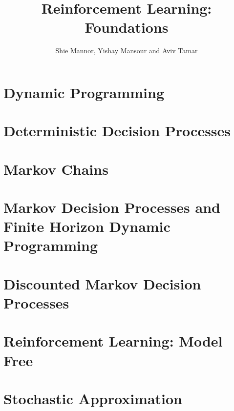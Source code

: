 \documentclass[12pt]{book}
\title{Reinforcement Learning: Foundations}
\date{February 2023
\\
  \textcolor{red}{This book is still work in progress. In particular, references to literature are not complete. We would be grateful for comments, suggestions, omissions, and errors of any kind, at \url{rlfoundationsbook@gmail.com}. }

}
\author{Shie Mannor, Yishay Mansour and Aviv Tamar}
\begin{document}
\maketitle

\tableofcontents

\chapter{Dynamic Programming}
\label{chapter:dp}


\chapter{Deterministic Decision Processes}
\label{chapter:DDP}


\chapter{Markov Chains}
\label{chapter:MC}


\chapter{Markov Decision Processes and Finite Horizon Dynamic Programming}
\label{chapter:MDP-FH}


\chapter{Discounted Markov Decision Processes}
\label{chapter:disc}


% 

\chapter{Reinforcement Learning: Model Free}
\label{chapter:learning-model-free}

\newpage


\chapter{Stochastic Approximation}
\label{chapter:stochastic_approx}

\end{document}
